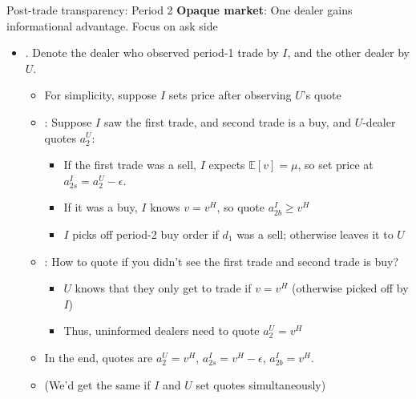 \documentclass[english,10pt
,aspectratio=169
]{beamer}
\begin{document}
\begin{frame}{Post-trade transparency: Period 2}
	\textbf{Opaque market}: One dealer gains informational advantage. Focus on \alert{ask side}
	\begin{itemize}
		\item {}. Denote the dealer who observed period-1 trade by \alert{$I$}, and the other dealer by \alert{$U$}.
		\begin{itemize}
			\item For simplicity, suppose $I$ sets price after observing $U$'s quote
			\item {}: Suppose $I$ saw the first trade, and second trade is a buy, and $U$-dealer quotes $a_2^U$:
			\begin{itemize}
				\item If the first trade was a sell, $I$ expects $\mathbb{E}[v]=\mu$, so set price at $a^I_{2s}=a^U_2 - \epsilon$.
				\item If it was a buy, $I$ knows $v=v^H$, so quote $a^I_{2b} \geq v^H$
				\item $I$ picks off period-2 buy order if $d_1$ was a sell; otherwise leaves it to $U$
			\end{itemize}
			\item {}: How to quote if you didn't see the first trade and second trade is buy? 
			\begin{itemize}
				\item $U$ knows that they only get to trade if $v=v^H$ (otherwise picked off by $I$)
				\item Thus, uninformed dealers need to quote $a^U_2=v^{H}$
			\end{itemize}
			\item In the end, quotes are $a^U_2=v^{H}$, $a^I_{2s}=v^H - \epsilon$, $a^I_{2b}=v^H$.
			\item (We'd get the same if $I$ and $U$ set quotes simultaneously)
		\end{itemize}
	\end{itemize}
\end{frame}
\end{document}
